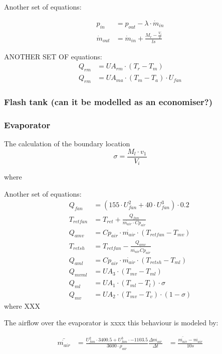 Another set of equations:

\begin{align}
	p_{in}	 			& = p_{out} - \lambda \cdot \dot{m}_{in} \\
	\dot{m}_{out}		& = \dot{m}_{in} + \frac{M_r - \frac{V_i}{v}}{ls}
\end{align}

ANOTHER SET OF equations:
\begin{align}
	Q_{rm}	 			& = U A_{rm} \cdot (T_r - T_m)\\
	Q_{rm}	 			& = U A_{ma} \cdot (T_m - T_a)\cdot U_{fan}
\end{align}

\subsubsection{Flash tank (can it be modelled as an economiser?)}

\subsubsection{Evaporator}

The calculation of the boundary location 
\begin{equation}
	\sigma = \frac{M_l \cdot v_1}{V_i}
\end{equation}

where


Another set of equations:
\begin{align}
	Q_{fan} 		& = (155 \cdot U_{fan}^2 + 40 \cdot U_{fan}^3) \cdot 0.2 \\
	T_{retfan} 		& = T_{ret} + \frac{Q_{fan}}{\dot{m_{air}} \cdot Cp_{air}} \\
	Q_{amv} 		& = Cp_{air} \cdot \dot{m_{air}} \cdot (T_{retfan} - T_{mv}) \\
	T_{retsh} 		& = T_{retfan} - \frac{Q_{amv}}{\dot{m_{air}} \dot Cp_{air}} \\
	Q_{aml} 		& = Cp_{air} \cdot \dot{m_{air}} \cdot (T_{retsh} - T_{ml}) \\
	Q_{mvml} 		& = U A_3 \cdot (T_{mv} - T_{ml}) \\
	Q_{ml} 			& = U A_1 \cdot (T_{ml} - T_l) \cdot \sigma\\
	Q_{mv} 			& = U A_2 \cdot (T_{mv} - T_v) \cdot (1- \sigma)
\end{align}
where
XXX

The airflow over the evaporator is xxxx this behaviour is modeled by:

\begin{align}
	\bar{\dot{m_{air}}} & = \frac{U_{fan}^2 \cdot 3400.5 + U_{fan}^3 \cdot -1103.5} {3600 \cdot \rho_{air}}
	\frac{\Delta \dot{m_{air}}}{\Delta t} & = \frac{\bar{\dot{m_{air}}} - \dot{m_{air}}} {10s}
\end{align}

